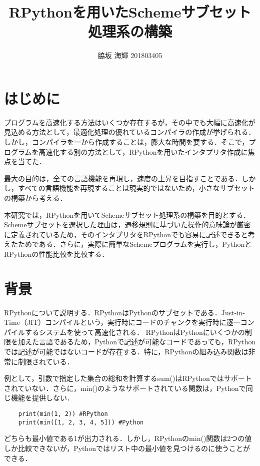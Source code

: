 \documentclass[twocolumn]{jsarticle}
\title{\textbf{RPythonを用いたSchemeサブセット処理系の構築}}
\author{脇坂 海輝 201803405}
\date{} %
\begin{document}
\maketitle
\thispagestyle{fancy}

\section{はじめに}

 プログラムを高速化する方法はいくつか存在するが，その中でも大幅に高速化が見込める方法として，最適化処理の優れているコンパイラの作成が挙げられる．しかし，コンパイラを一から作成することは，膨大な時間を要する．そこで，プログラムを高速化する別の方法として，RPythonを用いたインタプリタ作成に焦点を当てた．
 
 最大の目的は，全ての言語機能を再現し，速度の上昇を目指すことである．しかし，すべての言語機能を再現することは現実的ではないため，小さなサブセットの構築から考える．
 
 本研究では，RPythonを用いてSchemeサブセット処理系の構築を目的とする．Schemeサブセットを選択した理由は，遷移規則に基づいた操作的意味論が厳密に定義されているため，そのインタプリタをRPythonでも容易に記述できると考えたためである．さらに，実際に簡単なSchemeプログラムを実行し，PythonとRPythonの性能比較を比較する．

\section{背景}

RPythonについて説明する．RPythonはPythonのサブセットである．Just-in-Time（JIT）コンパイルという，実行時にコードのチャンクを実行時に逐一コンパイルするシステムを使って高速化される．
RPythonはPythonにいくつかの制限を加えた言語であるため，Pythonで記述が可能なコードであっても，RPythonでは記述が可能ではないコードが存在する．特に，RPythonの組み込み関数は非常に制限されている．

例として，引数で指定した集合の総和を計算するsum()はRPythonではサポートされていない．さらに，min()のようなサポートされている関数は，Pythonで同じ機能を提供しない．


\begin{verbatim}
    print(min(1, 2)) #RPython
    print(min([1, 2, 3, 4, 5])) #Python
\end{verbatim}

\noindent
どちらも最小値である1が出力される．しかし，RPythonのmin()関数は2つの値しか比較できないが，Pythonではリスト中の最小値を見つけるのに使うことができる．
\end{document}
